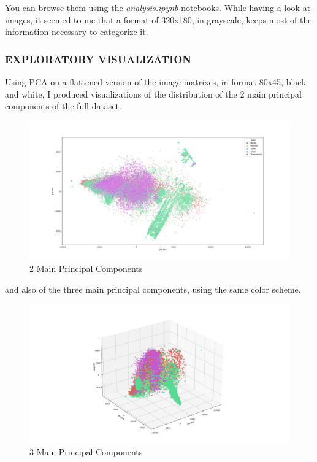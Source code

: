 \documentclass[
]{article}
\begin{document}
You can browse them using the \emph{analysis.ipynb} notebooks. While
having a look at images, it seemed to me that a format of 320x180, in
grayscale, keeps most of the information necessary to categorize it. 

\hypertarget{exploratory-visualization}{%
\subsubsection{EXPLORATORY
VISUALIZATION}\label{exploratory-visualization}}

Using PCA on a flattened version of the image matrixes, in format 80x45,
black and white, I produced visualizations of the distribution of the 2 main principal components of the full dataset. 

\begin{figure}[H]
\centering
\includegraphics{visualizations/pca_sklearn_2d_80_45_L.png}
\caption{2 Main Principal Components}
\end{figure}

and also of the three main principal components, using the same color scheme.

\begin{figure}[H]
	\centering
	\includegraphics{visualizations/pca_sklearn_3d_80_45_L.png}
	\caption{3 Main Principal Components}
\end{figure}
\end{document}
